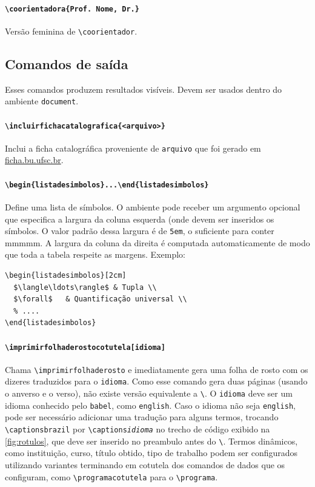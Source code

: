 \documentclass[embeddedlogo]{ufsc-thesis-rn46-2019}
\newcommand{\lacmd}[1]{\texttt{\textbackslash{}#1}}
\newcommand{\laenv}[1]{\texttt{\textbackslash{}begin\{#1\}...\textbackslash{}end\{#1\}}}
\begin{document}
\paragraph*{\lacmd{coorientadora\{Prof. Nome, Dr.\}}} Versão feminina de \lacmd{coorientador}.

\subsection{Comandos de saída}

Esses comandos produzem resultados visíveis. Devem ser usados dentro do
ambiente \texttt{document}.

\paragraph*{\lacmd{incluirfichacatalografica\{<arquivo>\}}}
Inclui a ficha catalográfica proveniente de \texttt{arquivo} que foi gerado em
\href{http://ficha.bu.ufsc.br/}{ficha.bu.ufsc.br}.

\paragraph*{\laenv{listadesimbolos}}
Define uma lista de símbolos. O ambiente pode receber um argumento opcional que
especifica a largura da coluna esquerda (onde devem ser inseridos os símbolos. O
valor padrão dessa largura é de \texttt{5em}, o suficiente para conter mmmmm. A
largura da coluna da direita é computada automaticamente de modo que toda a
tabela respeite as margens. Exemplo:

\begin{verbatim}
\begin{listadesimbolos}[2cm]
  $\langle\ldots\rangle$ & Tupla \\
  $\forall$   & Quantificação universal \\
  % ....
\end{listadesimbolos}
\end{verbatim}


\paragraph*{\lacmd{imprimirfolhaderostocotutela[idioma]}} Chama
\lacmd{imprimirfolhaderosto} e imediatamente gera uma folha de rosto com os
dizeres traduzidos para o \texttt{idioma}. Como esse comando gera duas páginas
(usando o anverso e o verso), não existe versão equivalente a
\lacmd{\imprimirfolhaderosto*}. O \texttt{idioma} deve ser um idioma conhecido
pelo \texttt{babel}, como \texttt{english}. Caso o idioma não seja
\texttt{english}, pode ser necessário adicionar uma tradução para alguns termos,
trocando \lacmd{captionsbrazil} por \lacmd{captions\emph{idioma}} no trecho de
código exibido na \autoref{fig:rotulos}, que deve ser inserido no preambulo
antes do \lacmd{\imprimirfolhaderostocotutela}. Termos dinâmicos, como
instituição, curso, título obtido, tipo de trabalho podem ser configurados
utilizando variantes terminando em cotutela dos comandos de dados que os
configuram, como \lacmd{programacotutela} para o \lacmd{programa}.
\end{document}
